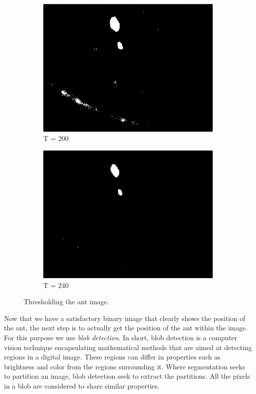 \begin{figure}
\begin{subfigure}[b]{0.4\textwidth}
                \includegraphics[scale = 0.2]{img/thresh200}
                \caption{T = 200}
        \end{subfigure}
		\quad
        \begin{subfigure}[b]{0.4\textwidth}
                \includegraphics[scale = 0.2]{img/thresh240}
                \caption{T = 240}
        \end{subfigure}
		\caption{Thresholding the ant image.}
		\label{fig:threshant}
\end{figure}

Now that we have a satisfactory binary image that clearly shows the position of the ant, the next step is to actually get the position of the ant within the image. For this purpose we use \textit{blob detection}. In short, blob detection is a computer vision technique encapsulating mathematical methods that are aimed at detecting regions in a digital image. These regions can differ in properties such as brightness and color from the regions surrounding it. Where segmentation seeks to partition an image, blob detection seek to extract the partitions. All the pixels in a blob are considered to share similar properties. \\

